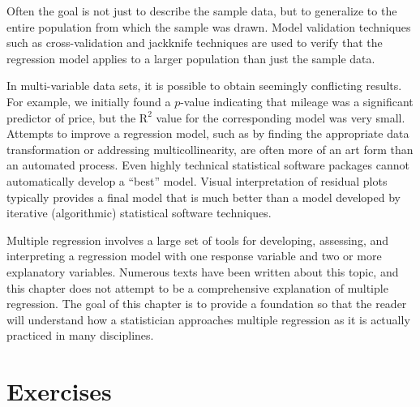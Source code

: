 \documentclass[
]{book}
\begin{document}
Often the goal is not just to describe the sample data, but to generalize to the entire population from which the sample was drawn. Model validation techniques such as cross-validation and jackknife techniques are used to verify that the regression model applies to a larger population than just the sample data.

In multi-variable data sets, it is possible to obtain seemingly conflicting results. For example, we initially
found a \(p\)-value indicating that mileage was a significant predictor of price, but the \(\mathrm{R}^2\) value for the corresponding model was very small. Attempts to improve a regression model, such as by finding the appropriate data transformation or addressing multicollinearity, are often more of an art form than an automated process. Even highly technical statistical software packages cannot automatically develop a ``best'' model. Visual interpretation of residual plots typically provides a final model that is much better than a model developed by iterative (algorithmic) statistical software techniques.

Multiple regression involves a large set of tools for developing, assessing, and interpreting a regression model with one response variable and two or more explanatory variables. Numerous texts have been written about this topic, and this chapter does not attempt to be a comprehensive explanation of multiple regression. The goal of this chapter is to provide a foundation so that the reader will understand how a statistician approaches multiple regression as it is actually practiced in many disciplines.

\hypertarget{exercises-2}{%
\section{Exercises}\label{exercises-2}}
\end{document}
